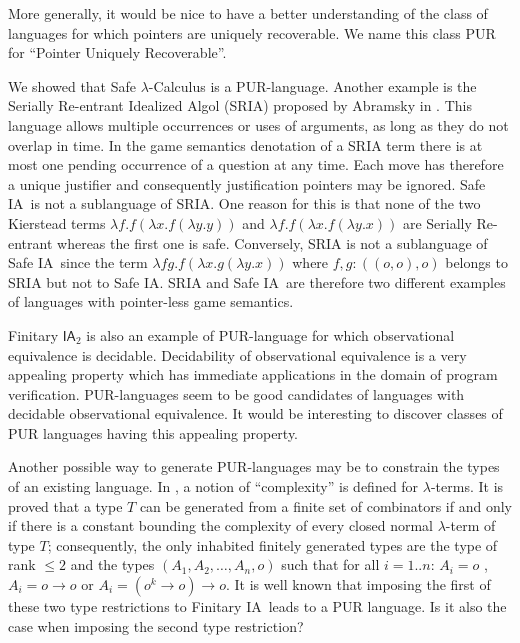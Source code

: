 \documentclass{llncs}
\newcommand\ialgol{\textsf{IA}}
\begin{document}
More generally, it would be nice to have a better understanding of the class of languages for
which pointers are uniquely recoverable. We name this class PUR for
``Pointer Uniquely Recoverable''.

We showed that Safe $\lambda$-Calculus is a PUR-language. Another
example is the Serially Re-entrant Idealized Algol (SRIA) proposed
by Abramsky  in \cite{abramsky:mchecking_ia}. This language allows
multiple occurrences or uses of arguments, as long as they do not
overlap in time. In the game semantics denotation of a SRIA term
there is at most one pending occurrence of a question at any time.
Each move has therefore a unique justifier and consequently
justification pointers may be ignored. Safe \ialgol\ is not a
sublanguage of SRIA. One reason for this is that none of the two
Kierstead terms $\lambda f . f (\lambda x . f (\lambda y .y ))$ and
$\lambda f . f (\lambda x . f (\lambda y .x ))$ are Serially
Re-entrant whereas the first one is safe. Conversely, SRIA is not a
sublanguage of Safe \ialgol\ since the term $\lambda f g. f (\lambda
x . g (\lambda y .x ))$ where $f,g:((o,o),o)$ belongs to SRIA but
not to Safe \ialgol. SRIA and Safe \ialgol\ are therefore two
different examples of languages with pointer-less game semantics.

Finitary $\ialgol_2$ is also an example of PUR-language for which
observational equivalence is decidable. Decidability of observational equivalence is a very
appealing property which has immediate applications in the domain of
program verification. PUR-languages seem to be good
candidates of languages with decidable observational equivalence.
It would be interesting to discover classes of PUR
languages having this appealing property.

Another possible way to generate PUR-languages may be to constrain
the types of an existing language. In \cite{DBLP:conf/tlca/Joly01},
a notion of ``complexity'' is defined for $\lambda$-terms. It is
proved that a type $T$ can be generated from a finite set of
combinators if and only if there is a constant bounding the
complexity of every closed normal $\lambda$-term of type $T$;
consequently, the only inhabited finitely generated types are the
type of rank $\leq 2$ and the types $(A_1, A_2, \ldots, A_n, o)$
such that for all $i = 1..n$: $A_i = o$ , $A_i = o \rightarrow o$ or
$A_i = (o^k \rightarrow o) \rightarrow o$. It is well known that imposing the
first of these two type restrictions to Finitary \ialgol\ leads to a
PUR language. Is it also the case when imposing the second type
restriction?




\end{document}
